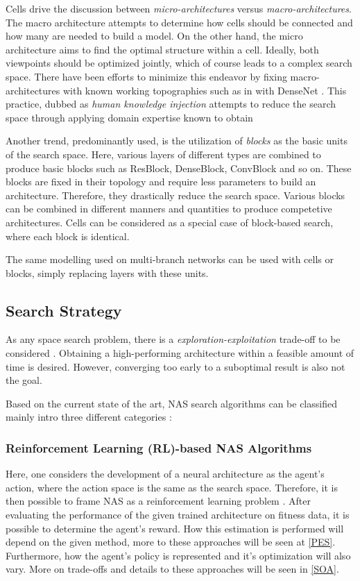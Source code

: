\documentclass[10pt,        %
               a4paper,     %
               journal,     %
               ]{IEEEtran}
\begin{document}
Cells drive the discussion between \textit{micro-architectures} versus \textit{macro-architectures}. The macro architecture
attempts to determine how cells should be connected and how many are needed to build a model. On the other hand, the micro
architecture aims to find the optimal structure within a cell. Ideally, both viewpoints should be optimized jointly, which of course
leads to a complex search space. There have been efforts to minimize this endeavor by fixing macro-architectures with
known working topographies such as in \cite{pmlr-v80-cai18a} with DenseNet \cite{Huang_2017_CVPR}. This practice, dubbed as
\textit{human knowledge injection} attempts to reduce the search space through applying domain expertise known to obtain

Another trend, predominantly used, is the utilization of \textit{blocks} as the basic units of the search space. Here, various layers of different types
are combined to produce basic blocks such as ResBlock, DenseBlock, ConvBlock and so on. These blocks are fixed in their topology
and require less parameters to build an architecture. Therefore, they drastically reduce the search space. Various blocks can be combined
in different manners and quantities to produce competetive architectures. Cells can be considered as a special case of block-based
search, where each block is identical.

The same modelling used on multi-branch networks can be used with cells or blocks, simply replacing layers with
these units.

\subsection{Search Strategy}
As any space search problem, there is a \textit{exploration-exploitation} trade-off to be considered \cite{elsken2019neural}.
Obtaining a high-performing architecture within a feasible amount of time is desired. However, converging too early to a
suboptimal result is also not the goal.

Based on the current state of the art, NAS search algorithms can be classified mainly intro three different
categories \cite{liu2021survey}:

\subsubsection{\textbf{Reinforcement Learning} (RL)-based NAS Algorithms}
Here, one considers the development of a neural architecture as the agent's action, where the action space is the same as
the search space. Therefore, it is then possible to frame NAS as a reinforcement learning problem \cite{elsken2019neural}.
After evaluating the performance of the given trained architecture on fitness data, it is possible to
determine the agent's reward. How this estimation is performed will depend on the given method, more to these
approaches will be seen at \ref{PES}. Furthermore, how the agent's policy is represented and it's optimization will
also vary. More on trade-offs and details to these approaches will be seen in \ref{SOA}.
\end{document}
